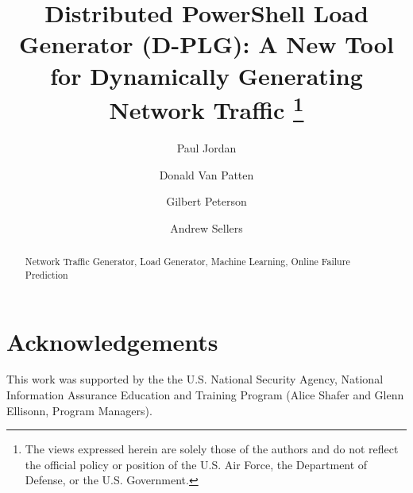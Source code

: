 \documentclass[runningheads,a4paper]{llncs}
\newcommand{\keywords}[1]{\par\addvspace\baselineskip\noindent\keywordname\enspace\ignorespaces#1}
\begin{document}
\mainmatter

\title{Distributed PowerShell Load Generator (D-PLG): A New Tool for %
Dynamically Generating Network Traffic%
\thanks{The views expressed herein are solely those of the authors and do not
reflect the official policy or position of the U.S. Air Force, the Department
of Defense, or the U.S.  Government.}}


\author{Paul Jordan \and Donald Van Patten\and Gilbert
Peterson\and Andrew Sellers}
%



\maketitle

\begin{abstract}

\keywords{Network Traffic Generator, Load Generator, Machine Learning, Online
Failure Prediction}
\end{abstract}

 



\section*{Acknowledgements}
This work was supported by the the U.S. National Security Agency, National
Information Assurance Education and Training Program (Alice Shafer and Glenn
Ellisonn, Program Managers).

\vfill


\end{document}
